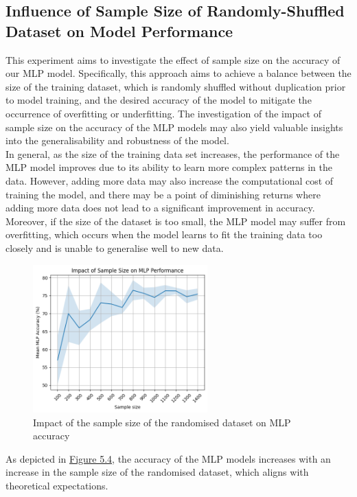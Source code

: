 \documentclass[11pt, a4paper]{report}
\begin{document}
\subsection{Influence of Sample Size of Randomly-Shuffled Dataset on Model Performance}\label{sec:5.3.2}
This experiment aims to investigate the effect of sample size on the accuracy of our MLP model. Specifically, this approach aims to achieve a balance between the size of the training dataset, which is randomly shuffled without duplication prior to model training, and the desired accuracy of the model to mitigate the occurrence of overfitting or underfitting. The investigation of the impact of sample size on the accuracy of the MLP models may also yield valuable insights into the generalisability and robustness of the model.\\

In general, as the size of the training data set increases, the performance of the MLP model improves due to its ability to learn more complex patterns in the data. However, adding more data may also increase the computational cost of training the model, and there may be a point of diminishing returns where adding more data does not lead to a significant improvement in accuracy. Moreover, if the size of the dataset is too small, the MLP model may suffer from overfitting, which occurs when the model learns to fit the training data too closely and is unable to generalise well to new data.
\begin{figure}[H]
    \centering 
    \includegraphics[width=0.6\textwidth]{docs/Project Report/Media/5_3_2_exp2_plot.png}
    \caption{Impact of the sample size of the randomised dataset on MLP accuracy}
    \label{fig:5.4}
\end{figure}
As depicted in \hyperref[fig:5.4]{Figure 5.4}, the accuracy of the MLP models increases with an increase in the sample size of the randomised dataset, which aligns with theoretical expectations.
\end{document}
